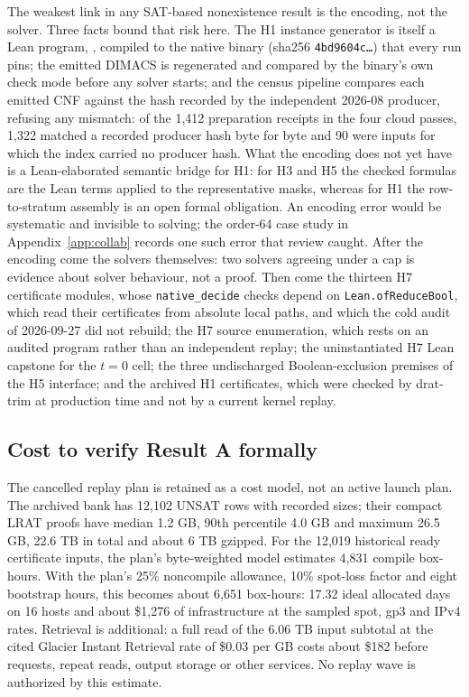 \documentclass{anvil-paper}
\theoremstyle{definition}
\begin{document}
The weakest link in any SAT-based nonexistence result is the encoding, not the solver. Three facts bound that risk here. The H1 instance generator is itself a Lean program, , compiled to the native  binary (sha256 \texttt{4bd9604c\ldots}) that every run pins; the emitted DIMACS is regenerated and compared by the binary's own check mode before any solver starts; and the census pipeline compares each emitted CNF against the hash recorded by the independent 2026-08 producer, refusing any mismatch: of the 1,412 preparation receipts in the four cloud passes, 1,322 matched a recorded producer hash byte for byte and 90 were inputs for which the index carried no producer hash. What the encoding does not yet have is a Lean-elaborated semantic bridge for H1: for H3 and H5 the checked formulas are the Lean terms  applied to the representative masks, whereas for H1 the row-to-stratum assembly is an open formal obligation. An encoding error would be systematic and invisible to solving; the order-64 case study in Appendix~\ref{app:collab} records one such error that review caught. After the encoding come the solvers themselves: two solvers agreeing under a cap is evidence about solver behaviour, not a proof. Then come the thirteen H7 certificate modules, whose \texttt{native\_decide} checks depend on \texttt{Lean.ofReduceBool}, which read their certificates from absolute local paths, and which the cold audit of 2026-09-27 did not rebuild; the H7 source enumeration, which rests on an audited program rather than an independent replay; the uninstantiated H7 Lean capstone for the $t=0$ cell; the three undischarged Boolean-exclusion premises of the H5 interface; and the archived H1 certificates, which were checked by drat-trim at production time and not by a current kernel replay.

\subsection{Cost to verify Result A formally}\label{sec:cost}

The cancelled replay plan is retained as a cost model, not an active launch plan. The archived bank has 12,102 UNSAT rows with recorded sizes; their compact LRAT proofs have median 1.2 GB, 90th percentile 4.0 GB and maximum 26.5 GB, 22.6 TB in total and about 6 TB gzipped. For the 12,019 historical ready certificate inputs, the plan's byte-weighted model estimates 4,831 compile box-hours. With the plan's 25\% noncompile allowance, 10\% spot-loss factor and eight bootstrap hours, this becomes about 6,651 box-hours: 17.32 ideal allocated days on 16 hosts and about \$1,276 of infrastructure at the sampled spot, gp3 and IPv4 rates. Retrieval is additional: a full read of the 6.06 TB input subtotal at the cited Glacier Instant Retrieval rate of \$0.03 per GB costs about \$182 before requests, repeat reads, output storage or other services. No replay wave is authorized by this estimate.
\end{document}
